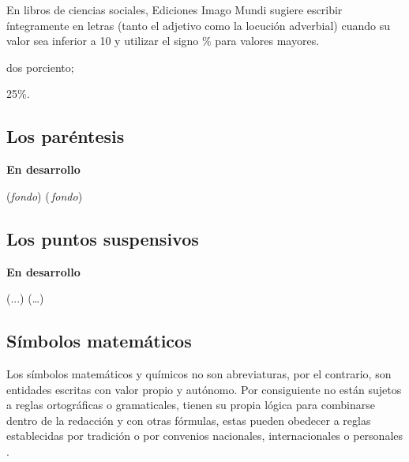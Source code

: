 \documentclass{book}
\begin{document}
{{{{{{{{En libros de ciencias sociales, Ediciones Imago Mundi sugiere escribir íntegramente en letras (tanto el adjetivo como la locución adverbial) cuando su valor sea inferior a 10 y utilizar el signo \% para valores mayores.

\begin{mdframed}[linewidth=.5pt,linecolor=black!30,roundcorner=3pt,backgroundcolor=yellow!15]
\begin{compactitem}
\item dos porciento;
\item 25\%.
\end{compactitem}
\end{mdframed}

\subsection{Los paréntesis}

\textbf{En desarrollo}

\begin{mdframed}[linewidth=.5pt,linecolor=black!30,roundcorner=3pt,backgroundcolor=yellow!15]
\begin{compactitem}
\item (\emph{fondo}) \quad ({\,}\emph{fondo})
\end{compactitem}
\end{mdframed}



\subsection{Los puntos suspensivos}

\textbf{En desarrollo}

\begin{mdframed}[linewidth=.5pt,linecolor=black!30,roundcorner=3pt,backgroundcolor=yellow!15]
\begin{compactitem}
\item (...) \quad (\dots)
\end{compactitem}
\end{mdframed}

\subsection{Símbolos matemáticos}

Los símbolos matemáticos y químicos no son abreviaturas, por el contrario, son entidades escritas con valor propio y autónomo. Por consiguiente no están sujetos a reglas ortográficas o gramaticales, tienen su propia lógica para combinarse dentro de la  redacción y con otras fórmulas, estas pueden obedecer a reglas establecidas por tradición o por convenios nacionales, internacionales o personales \parencite{Bezossf}.

}}}}}}}}
\end{document}
